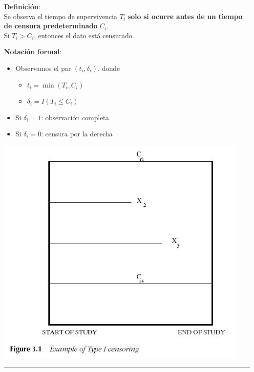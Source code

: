 \documentclass[
  letterpaper,
  DIV=11,
  numbers=noendperiod]{scrartcl}
\providecommand{\tightlist}{%
  \setlength{\itemsep}{0pt}\setlength{\parskip}{0pt}}
\begin{document}
\textbf{Definición}:\\
Se observa el tiempo de supervivencia \(T_i\) \textbf{solo si ocurre
antes de un tiempo de censura predeterminado} \(C_i\).\\
Si \(T_i > C_i\), entonces el dato está censurado.

\textbf{Notación formal}:

\begin{itemize}
\tightlist
\item
  Observamos el par \((t_i, \delta_i)\), donde

  \begin{itemize}
  \tightlist
  \item
    \(t_i = \min(T_i, C_i)\)\\
  \item
    \(\delta_i = I(T_i \le C_i)\)\\
  \end{itemize}
\item
  Si \(\delta_i = 1\): observación completa\\
\item
  Si \(\delta_i = 0\): censura por la derecha
\end{itemize}

\begin{center}
\includegraphics[width=0.9\linewidth,height=\textheight,keepaspectratio]{figura/CensuraI.jpg}
\end{center}

\begin{center}\rule{0.5\linewidth}{0.5pt}\end{center}
\end{document}
